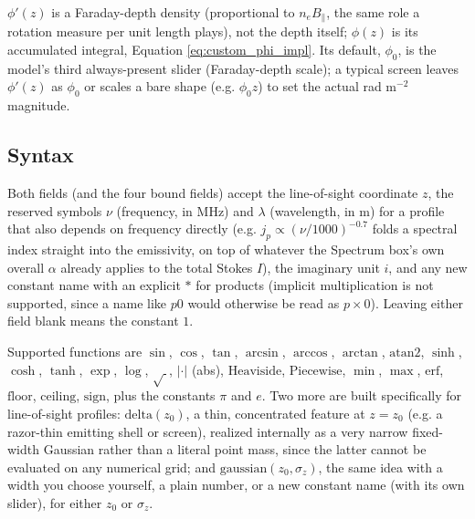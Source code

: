 $\phi'(z)$ is a Faraday-depth density (proportional to $n_e B_\parallel$, the same role a rotation measure per unit length plays), not the depth itself; $\phi(z)$ is its accumulated integral, Equation \ref{eq:custom_phi_impl}. Its default, $\phi_0$, is the model's third always-present slider (Faraday-depth scale); a typical screen leaves $\phi'(z)$ as $\phi_0$ or scales a bare shape (e.g. $\phi_0 z$) to set the actual rad m$^{-2}$ magnitude.
\\

\subsection{Syntax}
Both fields (and the four bound fields) accept the line-of-sight coordinate $z$, the reserved symbols $\nu$ (frequency, in MHz) and $\lambda$ (wavelength, in m) for a profile that also depends on frequency directly (e.g. $j_p\propto(\nu/1000)^{-0.7}$ folds a spectral index straight into the emissivity, on top of whatever the Spectrum box's own overall $\alpha$ already applies to the total Stokes $I$), the imaginary unit $i$, and any new constant name with an explicit $*$ for products (implicit multiplication is not supported, since a name like $p0$ would otherwise be read as $p\times0$). Leaving either field blank means the constant $1$.

Supported functions are $\sin$, $\cos$, $\tan$, $\arcsin$, $\arccos$, $\arctan$, $\mathrm{atan2}$, $\sinh$, $\cosh$, $\tanh$, $\exp$, $\log$, $\sqrt{\ }$, $|\cdot|$ (abs), $\mathrm{Heaviside}$, $\mathrm{Piecewise}$, $\min$, $\max$, $\mathrm{erf}$, $\mathrm{floor}$, $\mathrm{ceiling}$, $\mathrm{sign}$, plus the constants $\pi$ and $e$. Two more are built specifically for line-of-sight profiles: $\mathrm{delta}(z_0)$, a thin, concentrated feature at $z=z_0$ (e.g. a razor-thin emitting shell or screen), realized internally as a very narrow fixed-width Gaussian rather than a literal point mass, since the latter cannot be evaluated on any numerical grid; and $\mathrm{gaussian}(z_0,\sigma_z)$, the same idea with a width you choose yourself, a plain number, or a new constant name (with its own slider), for either $z_0$ or $\sigma_z$.
\\

